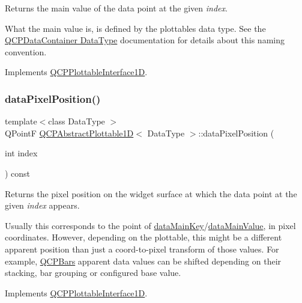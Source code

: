 Returns the main value of the data point at the given {\itshape index}.

What the main value is, is defined by the plottable\textquotesingle{}s data type. See the \hyperlink{class_q_c_p_data_container_qcpdatacontainer-datatype}{Q\+C\+P\+Data\+Container Data\+Type} documentation for details about this naming convention. 

Implements \hyperlink{class_q_c_p_plottable_interface1_d_af6330919e8023277d08c958a6074fc76}{Q\+C\+P\+Plottable\+Interface1D}.

\mbox{\label{class_q_c_p_abstract_plottable1_d_a6ca0699a6af5f25a7565de7c50ce13b2}} 
\subsubsection{\texorpdfstring{data\+Pixel\+Position()}{dataPixelPosition()}}
{\footnotesize\ttfamily template$<$class Data\+Type $>$ \\
Q\+PointF \hyperlink{class_q_c_p_abstract_plottable1_d}{Q\+C\+P\+Abstract\+Plottable1D}$<$ Data\+Type $>$\+::data\+Pixel\+Position (\begin{DoxyParamCaption}\item[{int}]{index }\end{DoxyParamCaption}) const\hspace{0.3cm}{\ttfamily [virtual]}}





Returns the pixel position on the widget surface at which the data point at the given {\itshape index} appears.

Usually this corresponds to the point of \hyperlink{class_q_c_p_abstract_plottable1_d_aeb156ebf5d3c8de906b428be30733ad8}{data\+Main\+Key}/\hyperlink{class_q_c_p_abstract_plottable1_d_a6be0f657ba85a1688336d76ad649ecf2}{data\+Main\+Value}, in pixel coordinates. However, depending on the plottable, this might be a different apparent position than just a coord-\/to-\/pixel transform of those values. For example, \hyperlink{class_q_c_p_bars}{Q\+C\+P\+Bars} apparent data values can be shifted depending on their stacking, bar grouping or configured base value. 

Implements \hyperlink{class_q_c_p_plottable_interface1_d_a78911838cfbcfd2d8df9ad2fdbfb8e93}{Q\+C\+P\+Plottable\+Interface1D}.



